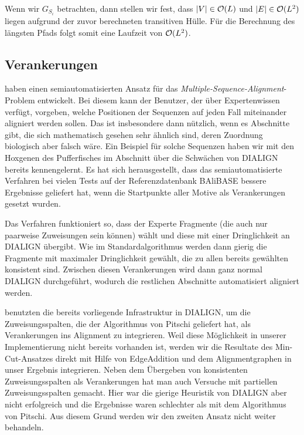 Wenn wir $G_{S_i}$ betrachten, dann stellen wir fest, dass $|V| \in \mathcal{O}(L)$ und $|E| \in \mathcal{O}(L^2)$ liegen aufgrund der zuvor berechneten transitiven Hülle. Für die Berechnung des längsten Pfads folgt somit eine Laufzeit von $\mathcal{O}(L^2)$.

\subsection{Verankerungen}

\cite{mpps06} haben einen semiautomatisierten Ansatz für das \emph{Multiple-Sequence-Alignment}-Problem entwickelt. Bei diesem kann der Benutzer, der über Expertenwissen verfügt, vorgeben, welche Positionen der Sequenzen auf jeden Fall miteinander aligniert werden sollen. Das ist insbesondere dann nützlich, wenn es Abschnitte gibt, die sich mathematisch gesehen sehr ähnlich sind, deren Zuordnung biologisch aber falsch wäre. Ein Beispiel für solche Sequenzen haben wir mit den Hoxgenen des Pufferfisches im Abschnitt über die Schwächen von DIALIGN bereits kennengelernt. Es hat sich herausgestellt, dass das semiautomatisierte Verfahren bei vielen Tests auf der Referenzdatenbank BAliBASE bessere Ergebnisse geliefert hat, wenn die Startpunkte aller Motive als Verankerungen gesetzt wurden.

Das Verfahren funktioniert so, dass der Experte Fragmente (die auch nur paarweise Zuweisungen sein können) wählt und diese mit einer Dringlichkeit an DIALIGN übergibt. Wie im Standardalgorithmus werden dann gierig die Fragmente mit maximaler Dringlichkeit gewählt, die zu allen bereits gewählten konsistent sind. Zwischen diesen Verankerungen wird dann ganz normal DIALIGN durchgeführt, wodurch die restlichen Abschnitte automatisiert aligniert werden.

\cite{cpm10} benutzten die bereits vorliegende Infrastruktur in DIALIGN, um die Zuweisungsspalten, die der Algorithmus von Pitschi geliefert hat, als Verankerungen ins Alignment zu integrieren. Weil diese Möglichkeit in unserer Implementierung nicht bereits vorhanden ist, werden wir die Resultate des Min-Cut-Ansatzes direkt mit Hilfe von \textrm{EdgeAddition} und dem Alignmentgraphen in unser Ergebnis integrieren. Neben dem Übergeben von konsistenten Zuweisungsspalten als Verankerungen hat man auch Versuche mit partiellen Zuweisungsspalten gemacht. Hier war die gierige Heuristik von DIALIGN aber nicht erfolgreich und die Ergebnisse waren schlechter als mit dem Algorithmus von Pitschi. Aus diesem Grund werden wir den zweiten Ansatz nicht weiter behandeln.

